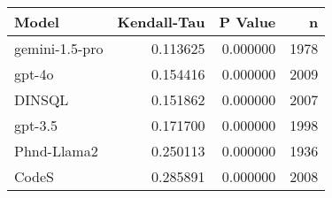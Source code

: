 \begin{tabular}{lrrr}
\toprule
Model & Kendall-Tau & P Value & n \\
\midrule
gemini-1.5-pro & 0.113625 & 0.000000 & 1978 \\
gpt-4o & 0.154416 & 0.000000 & 2009 \\
DINSQL & 0.151862 & 0.000000 & 2007 \\
gpt-3.5 & 0.171700 & 0.000000 & 1998 \\
Phnd-Llama2 & 0.250113 & 0.000000 & 1936 \\
CodeS & 0.285891 & 0.000000 & 2008 \\
\bottomrule
\end{tabular}
